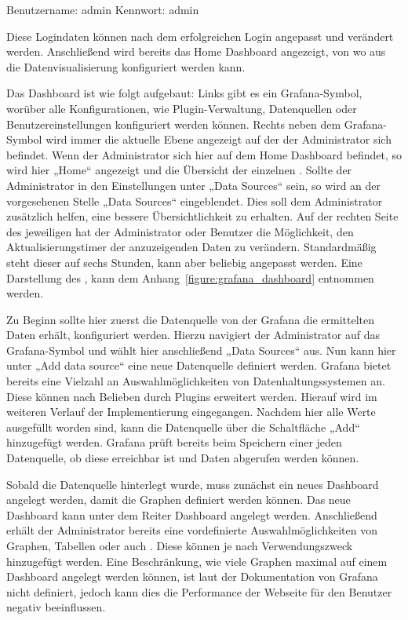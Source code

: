 \begin{outline}
  \1 Benutzername: admin
  \1 Kennwort: admin
\end{outline}

Diese Logindaten können nach dem erfolgreichen Login angepasst und verändert
werden. Anschließend wird bereits das Home \gls{Dashboard} angezeigt, von wo
aus die Datenvisualisierung konfiguriert werden kann.

Das \gls{Dashboard} ist wie folgt aufgebaut: Links gibt es ein
Grafana\hyp{}Symbol, worüber alle Konfigurationen, wie Plugin\hyp{}Verwaltung,
Datenquellen oder Benutzereinstellungen konfiguriert werden können. Rechts
neben dem Grafana\hyp{}Symbol wird immer die aktuelle Ebene angezeigt auf der
der Administrator sich befindet. Wenn der Administrator sich hier auf dem Home
\gls{Dashboard} befindet, so wird hier „Home“ angezeigt und die Übersicht der
einzelnen . Sollte der Administrator in den
Einstellungen unter „Data Sources“ sein, so wird an der vorgesehenen Stelle
„Data Sources“ eingeblendet. Dies soll dem Administrator zusätzlich helfen,
eine bessere Übersichtlichkeit zu erhalten. Auf der rechten Seite des
jeweiligen  hat der Administrator oder Benutzer
die Möglichkeit, den Aktualisierungstimer der anzuzeigenden Daten zu verändern.
Standardmäßig steht dieser auf sechs Stunden, kann aber beliebig angepasst
werden. Eine Darstellung des , kann dem
Anhang~\ref{figure:grafana_dashboard} entnommen werden.

Zu Beginn sollte hier zuerst die Datenquelle von der Grafana die ermittelten
Daten erhält, konfiguriert werden. Hierzu navigiert der Administrator auf das
Grafana\hyp{}Symbol und wählt hier anschließend „Data Sources“ aus. Nun kann
hier unter „Add data source“ eine neue Datenquelle definiert werden. Grafana
bietet bereits eine Vielzahl an Auswahlmöglichkeiten von Datenhaltungssystemen
an. Diese können nach Belieben durch Plugins erweitert werden. Hierauf wird im
weiteren Verlauf der Implementierung eingegangen. Nachdem hier alle Werte
ausgefüllt worden sind, kann die Datenquelle über die Schaltfläche „Add“
hinzugefügt werden. Grafana prüft bereits beim Speichern einer jeden
Datenquelle, ob diese erreichbar ist und Daten abgerufen werden können.

Sobald die Datenquelle hinterlegt wurde, muss zunächst ein neues
\gls{Dashboard} angelegt werden, damit die Graphen definiert werden können. Das
neue \gls{Dashboard} kann unter dem Reiter \gls{Dashboard} angelegt werden.
Anschließend erhält der Administrator bereits eine vordefinierte
Auswahlmöglichkeiten von Graphen, Tabellen oder auch
. Diese können je nach Verwendungszweck
hinzugefügt werden. Eine Beschränkung, wie viele Graphen maximal auf einem
\gls{Dashboard} angelegt werden können, ist laut der Dokumentation von Grafana
nicht definiert, jedoch kann dies die Performance der Webseite für den Benutzer
negativ beeinflussen.

